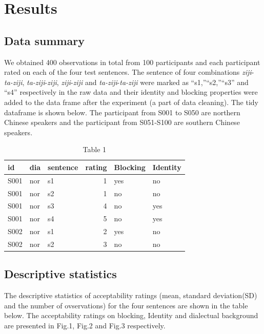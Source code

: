 \documentclass[
  english,
  man,floatsintext]{apa6}
\begin{document}
\hypertarget{results}{%
\section{Results}\label{results}}

\hypertarget{data-summary}{%
\subsection{Data summary}\label{data-summary}}

We obtained 400 observations in total from 100 participants and each participant rated on each of the four test sentences. The sentence of four combinations \emph{ziji}-\emph{ta-ziji}, \emph{ta-ziji}-\emph{ziji}, \emph{ziji}-\emph{ziji} and \emph{ta-ziji}-\emph{ta-ziji} were marked as ``s1,''``s2,''``s3'' and ``s4'' respectively in the raw data and their identity and blocking properties were added to the data frame after the experiment (a part of data cleaning). The tidy dataframe is shown below. The participant from S001 to S050 are northern Chinese speakers and the participant from S051-S100 are southern Chinese speakers.

\begin{table}

\caption{\label{tab:df}Table 1}
\centering
\begin{tabular}[t]{l|l|l|r|l|l}
\hline
id & dia & sentence & rating & Blocking & Identity\\
\hline
S001 & nor & s1 & 1 & yes & no\\
\hline
S001 & nor & s2 & 1 & no & no\\
\hline
S001 & nor & s3 & 4 & no & yes\\
\hline
S001 & nor & s4 & 5 & no & yes\\
\hline
S002 & nor & s1 & 2 & yes & no\\
\hline
S002 & nor & s2 & 3 & no & no\\
\hline
\end{tabular}
\end{table}

\hypertarget{descriptive-statistics}{%
\subsection{Descriptive statistics}\label{descriptive-statistics}}

The descriptive statistics of acceptability ratings (mean, standard deviation(SD) and the number of ovservations) for the four sentences are shown in the table below. The acceptability ratings on blocking, Identity and dialectual background are presented in Fig.1, Fig.2 and Fig.3 respectively.
\end{document}
